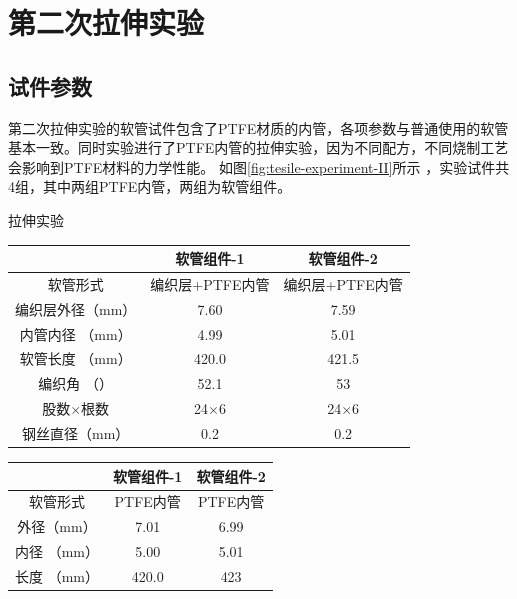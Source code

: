 \begin{figure}[!htb]
	\label{fig:experiment-1-fail}
\end{figure}









\section{第二次拉伸实验}
\subsection{试件参数}
第二次拉伸实验的软管试件包含了PTFE材质的内管，各项参数与普通使用的软管基本一致。同时实验进行了PTFE内管的拉伸实验，因为不同配方，不同烧制工艺会影响到PTFE材料的力学性能。
如图\ref{fig:tesile-experiment-II}所示 ，实验试件共4组，其中两组PTFE内管，两组为软管组件。

拉伸实验

\begin{table}[!htb]
	\centering
	\label{tab:hose-specimen-II}
	\begin{tabular*}{0.8\textwidth}{@{\extracolsep{\fill}}>{\hspace{0.5cm}}ccc}
		\toprule
		&     软管组件-1     &     软管组件-2     \\ \midrule
		软管形式& 编织层+PTFE内管&编织层+PTFE内管\\
		编织层外径（mm）            &     7.60      &     7.59      \\
		内管内径 （mm）           &     4.99      &     5.01      \\
		软管长度 （mm）           &     420.0     &     421.5     \\
		编织角 （\textdegree） &     52.1      &     53      \\
		股数$ \times $根数    & 24$ \times $6 & 24$ \times $6 \\
		钢丝直径（mm）          &      0.2      &      0.2      \\ \bottomrule
	\end{tabular*} 
\end{table}

\begin{table}[!htb]
	\centering
	\label{tab:hose-specimen-II-2}
	\begin{tabular*}{0.8\textwidth}{@{\extracolsep{\fill}}>{\hspace{0.5cm}}ccc}
		\toprule
		&     软管组件-1     &     软管组件-2     \\ \midrule
		软管形式& PTFE内管&PTFE内管\\
		外径（mm）            &     7.01      &     6.99      \\
		内径 （mm）           &     5.00      &     5.01      \\
		长度 （mm）           &     420.0     &     423     \\ \bottomrule
	\end{tabular*} 
\end{table}


